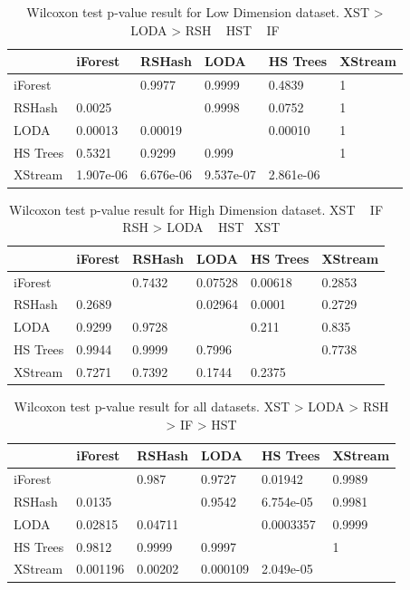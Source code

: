\begin{table}
\centering
    \begin{tabular}{|l|lllll|}
    \hline
    ~        & iForest   & RSHash    & LODA      & HS Trees  & XStream \\	\hline
    iForest  & ~         & 0.9977    & 0.9999    & 0.4839    & 1       \\ 
    RSHash   & 0.0025    & ~         & 0.9998    & 0.0752    & 1       \\
    LODA     & 0.00013   & 0.00019   & ~         & 0.00010   & 1       \\
    HS Trees & 0.5321    & 0.9299    & 0.999     & ~         & 1       \\
    XStream  & 1.907e-06 & 6.676e-06 & 9.537e-07 & 2.861e-06 & ~       \\	\hline
    \end{tabular}
    \caption{Wilcoxon test p-value result for Low Dimension dataset. XST > LODA > RSH ~ HST ~ IF}
\end{table}

\begin{table}
\centering
    \begin{tabular}{|l|lllll|}
    \hline
    ~        & iForest   & RSHash    & LODA      & HS Trees  & XStream \\	\hline
    iForest  & ~         & 0.7432    & 0.07528    & 0.00618    & 0.2853       \\ 
    RSHash   & 0.2689    & ~         &  0.02964   & 0.0001    & 0.2729       \\
    LODA     & 0.9299   & 0.9728   & ~         & 0.211   & 0.835      \\
    HS Trees & 0.9944    & 0.9999    & 0.7996     & ~         & 0.7738       \\
    XStream  & 0.7271 & 0.7392 & 0.1744 & 0.2375 & ~       \\	\hline
    \end{tabular}
    \caption{Wilcoxon test p-value result for High Dimension dataset. XST ~ IF ~ RSH >  LODA ~ HST ~XST}
\end{table}

\begin{table}
\centering
    \begin{tabular}{|l|lllll|}
    \hline
    ~        & iForest   & RSHash    & LODA      & HS Trees  & XStream \\	\hline
    iForest  & ~         & 0.987    & 0.9727    & 0.01942    & 0.9989       \\ 
    RSHash   & 0.0135    & ~         &  0.9542   & 6.754e-05    & 0.9981       \\
    LODA     & 0.02815   & 0.04711   & ~         & 0.0003357   & 0.9999      \\
    HS Trees & 0.9812    & 0.9999    & 0.9997     & ~         & 1       \\
    XStream  & 0.001196 & 0.00202 & 0.000109 & 2.049e-05 & ~       \\	\hline
    \end{tabular}
    \caption{Wilcoxon test p-value result for all datasets. XST > LODA > RSH > IF > HST}
\end{table}


